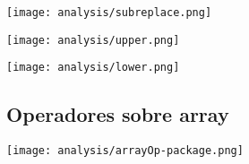 \begin{multicols}{2}
\begin{center}
\texttt{[image: analysis/subreplace.png]} 
\end{center}
\columnbreak
\begin{center}
\texttt{[image: analysis/upper.png]}
\end{center}
\end{multicols}

\begin{center}
\texttt{[image: analysis/lower.png]} 
\end{center}


\subsection {Operadores sobre array}
\begin{center}
\texttt{[image: analysis/arrayOp-package.png]} 
\end{center}

